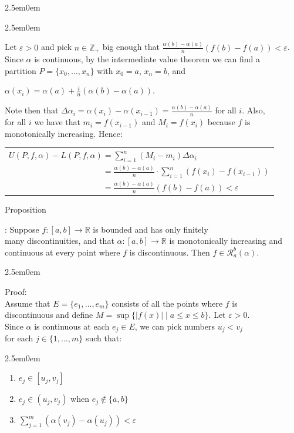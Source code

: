 \documentclass{book}
\newcommand{\hThree}{%
   \color{PineGreen!85!Orange}
   \fontsize{13}{15}\selectfont%
}
\newenvironment{myIndent}{%
   \begin{adjustwidth}{2.5em}{0em}%
}{%
   \end{adjustwidth}%
}
\newcounter{PropNumber}
\newcommand{\propCount}[1][1]{%
   \addtocounter{PropNumber}{#1}%
   \thePropNumber%
}
\newcommand{\retTwo}{\hfill\bigbreak}
\begin{document}
{\begin{myIndent}
{\begin{myIndent}
      Let $\varepsilon > 0$ and pick $n \in \mathbb{Z}_+$ big enough that $\frac{\alpha(b) - \alpha(a)}{n}\left(f(b) - f(a)\right) < \varepsilon$.\\ Since $\alpha$ is continuous, by the intermediate value theorem we can find a\\ partition $P = \{x_0, \ldots, x_n\}$ with $x_0 = a$, $x_n = b$, and

      {\centering $\alpha(x_i) = \alpha(a) + \frac{i}{n}(\alpha(b) - \alpha(a))$.\par}

      \newpage

      Note then that $\Delta \alpha_i = \alpha(x_i) - \alpha(x_{i-1}) = \frac{\alpha(b)- \alpha(a)}{n}$ for all $i$. Also,\\ for all $i$ we have that $m_i = f(x_{i-1})$ and $M_i = f(x_i)$ because $f$ is\\ monotonically increasing. Hence:\\
      \begin{tabular}{l}
         $U(P, f, \alpha) - L(P, f, \alpha) = \sum\limits_{i=1}^n(M_i - m_i)\Delta \alpha_i$ \\ [4pt]
         $\phantom{U(P, f, \alpha) - L(P, f, \alpha)} = \frac{\alpha(b) - \alpha(a)}{n}\cdot \sum\limits_{i=1}^n(f(x_{i}) - f(x_{i-1}))$\\ [4pt]
         $\phantom{U(P, f, \alpha) - L(P, f, \alpha)} = \frac{\alpha(b) - \alpha(a)}{n}\left(f(b) - f(a)\right) < \varepsilon$\retTwo\retTwo
      \end{tabular}
   \end{myIndent}}

   Proposition \propCount: Suppose $f: [a, b] \longrightarrow \mathbb{R}$ is bounded and has only finitely\\ many discontinuities, and that $\alpha: [a, b] \longrightarrow \mathbb{R}$ is monotonically increasing and\\ continuous at every point where $f$ is discontinuous. Then $f \in \mathscr{R}_a^b(\alpha)$.
   
   {\begin{myIndent}\hThree
      Proof:\\
      Assume that $E = \{e_1, \ldots, e_m\}$ consists of all the points where $f$ is\\ discontinuous and define $M = \sup\{|f(x)| \mid a \leq x \leq b\}$. Let $\varepsilon > 0$.\\ Since $\alpha$ is continuous at each $e_j \in E$, we can pick numbers $u_j  < v_j$\\ for each $j \in \{1, \ldots, m\}$ such that:
      \begin{myIndent}\begin{enumerate}
            \item $e_j \in [u_j, v_j]$
            \item $e_j \in (u_j, v_j)$ when $e_j \notin \{a, b\}$
            \item $\sum\limits_{j=1}^m\left(\alpha(v_j) - \alpha(u_j)\right) < \varepsilon$\retTwo
      \end{enumerate}\end{myIndent}


\end{myIndent}}
\end{myIndent}}
\end{document}
